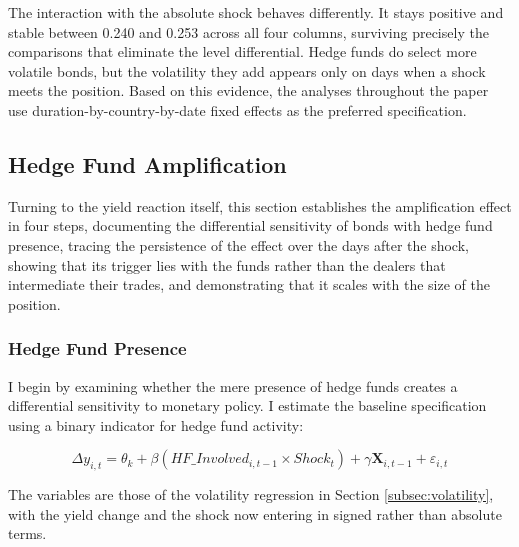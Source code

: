 \documentclass[english, 11pt, oneside]{article}
\begin{document}
The interaction with the absolute shock behaves differently. It stays positive and stable between 0.240 and 0.253 across all four columns, surviving precisely the comparisons that eliminate the level differential. Hedge funds do select more volatile bonds, but the volatility they add appears only on days when a shock meets the position. Based on this evidence, the analyses throughout the paper use duration-by-country-by-date fixed effects as the preferred specification.

\subsection{Hedge Fund Amplification}
\label{subsec:amplification}
Turning to the yield reaction itself, this section establishes the amplification effect in four steps, documenting the differential sensitivity of bonds with hedge fund presence, tracing the persistence of the effect over the days after the shock, showing that its trigger lies with the funds rather than the dealers that intermediate their trades, and demonstrating that it scales with the size of the position.

\subsubsection{Hedge Fund Presence}
\label{subsec:baseline}
I begin by examining whether the mere presence of hedge funds creates a differential sensitivity to monetary policy. I estimate the baseline specification using a binary indicator for hedge fund activity:

\begin{equation}
    \Delta y_{i,t} = \theta_{k} + \beta (HF\_Involved_{i,t-1} \times Shock_{t}) + \gamma \mathbf{X}_{i,t-1} + \varepsilon_{i,t}
\end{equation}

The variables are those of the volatility regression in Section \ref{subsec:volatility}, with the yield change and the shock now entering in signed rather than absolute terms.
\end{document}
